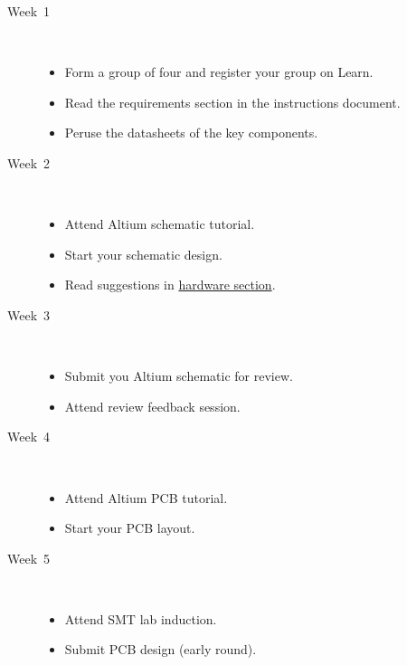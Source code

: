 \documentclass[11pt, a4paper]{article}
\begin{document}
\begin{description}
\item [Week~1]\mbox{}\\

  \begin{itemize}
  \item Form a group of four and register your group on Learn.
  \item Read the requirements section in the instructions document.
  \item Peruse the datasheets of the key components.
  \end{itemize}
  
\item [Week~2]\mbox{}\\
  
  \begin{itemize}
  \item Attend Altium schematic tutorial.
  \item Start your schematic design.
  \item Read suggestions in \hyperref[hardware]{hardware section}.
  \end{itemize}
  
\item [Week~3]\mbox{}\\
  
  \begin{itemize}
  \item Submit you Altium schematic for review.
  \item Attend review feedback session.
  \end{itemize}
  
\item [Week~4]\mbox{}\\
  
  \begin{itemize}
  \item Attend Altium PCB tutorial.
  \item Start your PCB layout.
  \end{itemize}
  
  
\item [Week~5]\mbox{}\\
  
  \begin{itemize}
  \item Attend SMT lab induction.
  \item Submit PCB design (early round).
  \end{itemize}
  

\end{description}
\end{document}
